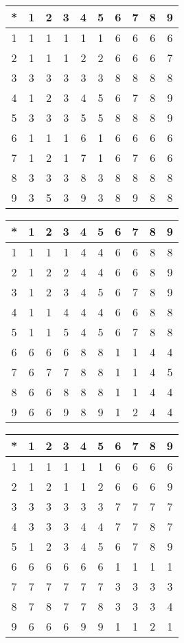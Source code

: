 \begin{tabular}[t]{c|ccccccccc}
*&1&2&3&4&5&6&7&8&9 \\ \hline
    1&1&1&1&1&1&6&6&6&6 \\
    2&1&1&1&2&2&6&6&6&7 \\
    3&3&3&3&3&3&8&8&8&8 \\
    4&1&2&3&4&5&6&7&8&9 \\
    5&3&3&3&5&5&8&8&8&9 \\
    6&1&1&1&6&1&6&6&6&6 \\
    7&1&2&1&7&1&6&7&6&6 \\
    8&3&3&3&8&3&8&8&8&8 \\
    9&3&5&3&9&3&8&9&8&8 
\end{tabular}


\begin{tabular}[t]{c|ccccccccc}
*&1&2&3&4&5&6&7&8&9 \\ \hline
    1&1&1&1&4&4&6&6&8&8 \\
    2&1&2&2&4&4&6&6&8&9 \\
    3&1&2&3&4&5&6&7&8&9 \\
    4&1&1&4&4&4&6&6&8&8 \\
    5&1&1&5&4&5&6&7&8&8 \\
    6&6&6&6&8&8&1&1&4&4 \\
    7&6&7&7&8&8&1&1&4&5 \\
    8&6&6&8&8&8&1&1&4&4 \\
    9&6&6&9&8&9&1&2&4&4 
\end{tabular}


\begin{tabular}[t]{c|ccccccccc}
*&1&2&3&4&5&6&7&8&9 \\ \hline
    1&1&1&1&1&1&6&6&6&6 \\
    2&1&2&1&1&2&6&6&6&9 \\
    3&3&3&3&3&3&7&7&7&7 \\
    4&3&3&3&4&4&7&7&8&7 \\
    5&1&2&3&4&5&6&7&8&9 \\
    6&6&6&6&6&6&1&1&1&1 \\
    7&7&7&7&7&7&3&3&3&3 \\
    8&7&8&7&7&8&3&3&3&4 \\
    9&6&6&6&9&9&1&1&2&1 
\end{tabular}


